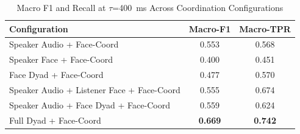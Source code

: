\begin{table}[h]
\caption{Macro F1 and Recall at $\tau$=400~ms Across Coordination Configurations}
\label{tab:macro_coordination}
\small
\renewcommand{\arraystretch}{1.20}
\begin{tabular}{>{\raggedright\arraybackslash}p{4cm}cc}
\toprule
Configuration & Macro-F1 & Macro-TPR \\
\midrule
Speaker Audio + Face-Coord & 0.553 & 0.568 \\
Speaker Face + Face-Coord & 0.400 & 0.451 \\
Face Dyad + Face-Coord & 0.477 & 0.570 \\
Speaker Audio + Listener Face + Face-Coord & 0.555 & 0.674 \\
Speaker Audio + Face Dyad + Face-Coord & 0.559 & 0.624 \\
Full Dyad + Face-Coord & \textbf{0.669} & \textbf{0.742} \\
\bottomrule
\end{tabular}
\end{table}

